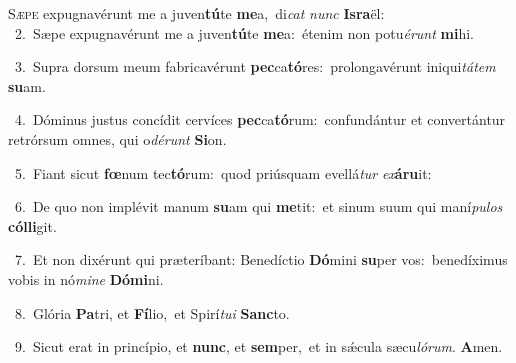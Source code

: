 \lettrine{\initial\textcolor{\initialcolor}{S}}{æpe} expugnavérunt me a juven\-\textbf{tú}\-te \textbf{me}\-a,~\star di\textit{cat} \textit{nunc} \textbf{Is}\-\textbf{ra}ël:\\
{\numbfont\textcolor{\numbcolor}{~2.}}~Sæpe expugnavérunt me a juven\-\textbf{tú}\-te \textbf{me}\-a:~\star étenim non potu\-\textit{é}\-\textit{runt} \textbf{mi}\-hi.\par
{\numbfont\textcolor{\numbcolor}{~3.}}~Supra dorsum meum fabricavérunt \textbf{pec}\-ca\-\textbf{tó}\-res:~\star prolongavérunt iniqui\-\textit{tá}\-\textit{tem} \textbf{su}\-am.\par
{\numbfont\textcolor{\numbcolor}{~4.}}~Dóminus justus concídit cervíces \textbf{pec}\-ca\-\textbf{tó}\-rum:~\star confundántur et convertántur retrórsum omnes, qui o\-\textit{dé}\-\textit{runt} \textbf{Si}\-on.\par
{\numbfont\textcolor{\numbcolor}{~5.}}~Fiant sicut \textbf{fœ}\-num tec\-\textbf{tó}\-rum:~\star quod priúsquam evellá\textit{tur} \textit{ex}\-\textbf{á}\textbf{ru}it:\par
{\numbfont\textcolor{\numbcolor}{~6.}}~De quo non implévit manum \textbf{su}\-am qui \textbf{me}\-tit:~\star et sinum suum qui maní\-\textit{pu}\-\textit{los} \textbf{cól}\-\textbf{li}git.\par
{\numbfont\textcolor{\numbcolor}{~7.}}~Et non dixérunt qui præteríbant: Benedíctio \textbf{Dó}\-mini \textbf{su}\-per vos:~\star benedíximus vobis in nó\-\textit{mi}\-\textit{ne} \textbf{Dó}\-\textbf{mi}ni.\par
{\numbfont\textcolor{\numbcolor}{~8.}}~Glória \textbf{Pa}\-tri, et \textbf{Fí}\-lio,~\star et Spirí\-\textit{tu}\-\textit{i} \textbf{Sanc}\-to.\par
{\numbfont\textcolor{\numbcolor}{~9.}}~Sicut erat in princípio, et \textbf{nunc}\-, et \textbf{sem}\-per,~\star et in sǽcula sæcu\-\textit{ló}\-\textit{rum}. \textbf{A}\-men.\par
